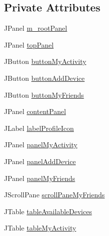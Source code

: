 \subsection*{Private Attributes}
\begin{DoxyCompactItemize}
\item 
J\+Panel \mbox{\hyperlink{classcom_1_1activitytracker_1_1_main_window_ac3d61c032aef87f12b1ae6f7dbf482c3}{m\+\_\+root\+Panel}}
\item 
J\+Panel \mbox{\hyperlink{classcom_1_1activitytracker_1_1_main_window_a6baf76b2b8ede1ba82fc6d096ddb580b}{top\+Panel}}
\item 
J\+Button \mbox{\hyperlink{classcom_1_1activitytracker_1_1_main_window_adec15801f8e16f769bd954e351a663fa}{button\+My\+Activity}}
\item 
J\+Button \mbox{\hyperlink{classcom_1_1activitytracker_1_1_main_window_af241d0ee8023ed099caa204419d74ccb}{button\+Add\+Device}}
\item 
J\+Button \mbox{\hyperlink{classcom_1_1activitytracker_1_1_main_window_a4d9543db1723fd7d1921f07cc92e2abb}{button\+My\+Friends}}
\item 
J\+Panel \mbox{\hyperlink{classcom_1_1activitytracker_1_1_main_window_aaa5ce3b10bff65231c65a3d4b33724b0}{content\+Panel}}
\item 
J\+Label \mbox{\hyperlink{classcom_1_1activitytracker_1_1_main_window_a05a555ba49d30b00573d07e5acd39e0a}{label\+Profile\+Icon}}
\item 
J\+Panel \mbox{\hyperlink{classcom_1_1activitytracker_1_1_main_window_a89833c824727a496f4a889177d4d3f3c}{panel\+My\+Activity}}
\item 
J\+Panel \mbox{\hyperlink{classcom_1_1activitytracker_1_1_main_window_a02f203d3c00a61d838fcee4657984584}{panel\+Add\+Device}}
\item 
J\+Panel \mbox{\hyperlink{classcom_1_1activitytracker_1_1_main_window_afc5efa70337b4b072b38c2cc30991473}{panel\+My\+Friends}}
\item 
J\+Scroll\+Pane \mbox{\hyperlink{classcom_1_1activitytracker_1_1_main_window_a4ef571b624e78e91f3ccad9234c0b5d3}{scroll\+Pane\+My\+Friends}}
\item 
J\+Table \mbox{\hyperlink{classcom_1_1activitytracker_1_1_main_window_a50012386053e035e7ae0fb993153b225}{table\+Available\+Devices}}
\item 
J\+Table \mbox{\hyperlink{classcom_1_1activitytracker_1_1_main_window_a0ad6d3ca1298275eba15a9ea189d4d9b}{table\+My\+Activity}}
\end{DoxyCompactItemize}


